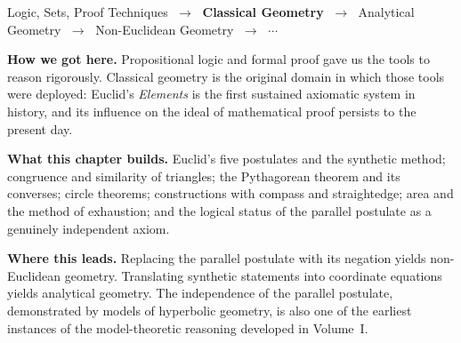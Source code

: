 
\begin{tcolorbox}[
  colback=gray!6,
  colframe=gray!40,
  arc=2pt,
  left=8pt, right=8pt, top=6pt, bottom=6pt,
  title={\small\textbf{Where You Are in the Journey}},
  fonttitle=\small\bfseries
]
\begin{center}
\small
Logic, Sets, Proof Techniques
$\;\to\;$ \textbf{Classical Geometry}
$\;\to\;$ Analytical Geometry
$\;\to\;$ Non-Euclidean Geometry
$\;\to\;$ $\cdots$
\end{center}

\medskip
\noindent\textbf{How we got here.}
Propositional logic and formal proof gave us the tools to reason
rigorously.
Classical geometry is the original domain in which those tools
were deployed: Euclid's \textit{Elements} is the first
sustained axiomatic system in history, and its influence on the
ideal of mathematical proof persists to the present day.

\medskip
\noindent\textbf{What this chapter builds.}
Euclid's five postulates and the synthetic method; congruence
and similarity of triangles; the Pythagorean theorem and its
converses; circle theorems; constructions with compass and
straightedge; area and the method of exhaustion; and the
logical status of the parallel postulate as a genuinely
independent axiom.

\medskip
\noindent\textbf{Where this leads.}
Replacing the parallel postulate with its negation yields
non-Euclidean geometry.
Translating synthetic statements into coordinate equations
yields analytical geometry.
The independence of the parallel postulate, demonstrated
by models of hyperbolic geometry, is also one of the
earliest instances of the model-theoretic reasoning developed
in Volume~I.
\end{tcolorbox}
\vspace{1em}

